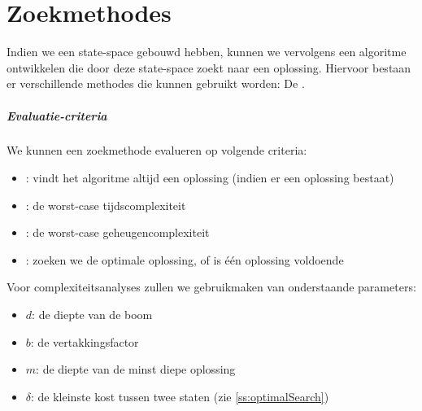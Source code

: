 \chapter{Zoekmethodes}
\label{s:searchMethods}
Indien we een state-space gebouwd hebben, kunnen we vervolgens een algoritme ontwikkelen die door deze state-space zoekt naar een oplossing. Hiervoor bestaan er verschillende methodes die kunnen gebruikt worden: De .
\paragraph{Evaluatie-criteria}
We kunnen een zoekmethode evalueren op volgende criteria:
\begin{itemize}
 \item {}: vindt het algoritme altijd een oplossing (indien er een oplossing bestaat)
 \item {}: de worst-case tijdscomplexiteit
 \item {}: de worst-case geheugencomplexiteit
 \item {}: zoeken we de optimale oplossing, of is \'e\'en oplossing voldoende
\end{itemize}
Voor complexiteitsanalyses zullen we gebruikmaken van onderstaande parameters:
\begin{itemize}
 \item $d$: de diepte van de boom
 \item $b$: de vertakkingsfactor
 \item $m$: de diepte van de minst diepe oplossing
 \item $\delta$: de kleinste kost tussen twee staten (zie \ref{ss:optimalSearch})
\end{itemize}
